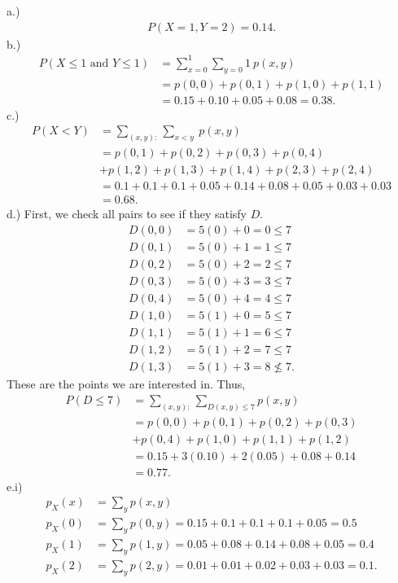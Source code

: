 \documentclass{report}
\begin{document}
\bigbreak \noindent 
a.)
\begin{align*}
    P(X=1, Y=2) = 0.14
.\end{align*}
\bigbreak \noindent 
b.)
\begin{align*}
    P(X \leq 1 \text{ and } Y \leq 1) &= \sum_{x=0}^{1} \sum_{y=0}{1}\ p(x,y) \\
    &=p(0,0) + p(0,1) + p(1,0) +p(1,1) \\
    &=0.15 + 0.10 + 0.05 + 0.08 = 0.38
.\end{align*}
\bigbreak \noindent 
c.) 
\begin{align*}
    P(X < Y) &= \sum_{(x,y):} \sum_{x<y} \ p(x,y)\\ 
             &=p(0,1) + p(0,2) + p(0,3) + p(0,4) \\
             &+p(1,2) + p(1,3) + p(1,4) + p(2,3) + p(2,4) \\
             &=0.1 + 0.1 + 0.1 + 0.05 + 0.14 + 0.08 + 0.05 + 0.03 + 0.03 \\
             &=0.68
.\end{align*}
\bigbreak \noindent 
d.) First, we check all pairs to see if they satisfy $D$.
\begin{align*}
    D(0,0) &= 5(0) + 0 = 0 \leq 7 \\
    D(0,1) &= 5(0) + 1 = 1 \leq 7 \\
    D(0,2) &= 5(0) + 2 = 2 \leq 7 \\
    D(0,3) &= 5(0) + 3 = 3 \leq 7 \\
    D(0,4) &= 5(0) + 4 = 4 \leq 7  \\
    D(1,0) &= 5(1) + 0 = 5 \leq 7  \\
    D(1,1) &= 5(1) + 1 = 6 \leq 7 \\
    D(1,2) &= 5(1) + 2 = 7 \leq 7 \\
    D(1,3) &= 5(1) + 3 = 8 \nleq 7
.\end{align*}
\bigbreak \noindent 
These are the points we are interested in. Thus,
\begin{align*}
    P(D \leq 7) &= \sum_{(x,y):} \sum_{D(x,y) \leq 7} p(x,y) \\
    &=p(0,0) + p(0,1) + p(0,2) + p(0,3)  \\
    &+ p(0,4) + p(1,0) + p(1,1) + p(1,2) \\
    &= 0.15 + 3(0.10) + 2(0.05) + 0.08 + 0.14 \\
    &=0.77
.\end{align*}
\bigbreak \noindent 
e.i) 
\begin{align*}
    p_{X}(x) &= \sum_y p(x,y) \\
    p_{X}(0) &= \sum_{y} p(0,y) =  0.15 + 0.1 + 0.1 + 0.1 + 0.05 = 0.5 \\
    p_{X}(1) &= \sum_{y} p(1,y) = 0.05 + 0.08 + 0.14 + 0.08 + 0.05 = 0.4 \\
    p_{X}(2) &=\sum_{y} p(2,y) =  0.01 + 0.01 + 0.02 + 0.03 + 0.03 = 0.1
.\end{align*}
\end{document}

